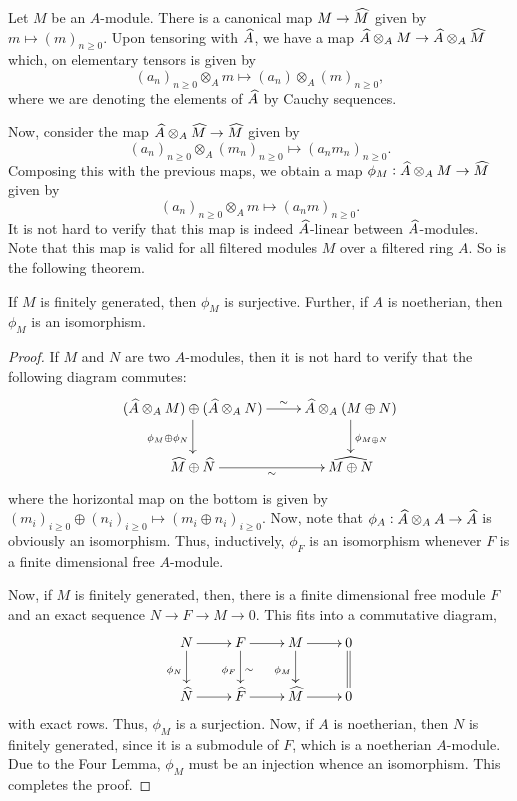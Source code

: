 Let $M$ be an $A$-module. There is a canonical map $M\to\widehat{M}$ given by $m\mapsto(m)_{n\ge 0}$. Upon tensoring with $\widehat{A}$, we have a map $\widehat{A}\otimes_A M\to\widehat{A}\otimes_A\widehat{M}$ which, on elementary tensors is given by 
\begin{equation*}
    (a_n)_{n\ge 0}\otimes_A m\mapsto(a_n)\otimes_A(m)_{n\ge 0},
\end{equation*}
where we are denoting the elements of $\widehat{A}$ by Cauchy sequences. 

Now, consider the map $\widehat{A}\otimes_A\widehat{M}\to\widehat{M}$ given by 
\begin{equation*}
    (a_n)_{n\ge 0}\otimes_A(m_n)_{n\ge 0}\mapsto (a_nm_n)_{n\ge 0}.
\end{equation*}
Composing this with the previous maps, we obtain a map $\phi_M:\widehat{A}\otimes_A M\to\widehat{M}$ given by 
\begin{equation*}
    (a_n)_{n\ge 0}\otimes_A m\mapsto (a_nm)_{n\ge 0}.
\end{equation*}
It is not hard to verify that this map is indeed $\widehat{A}$-linear between $\widehat{A}$-modules. Note that this map is valid for all filtered modules $M$ over a filtered ring $A$. So is the following theorem.

\begin{theorem}
    If $M$ is finitely generated, then $\phi_M$ is surjective. Further, if $A$ is noetherian, then $\phi_M$ is an isomorphism.
\end{theorem}
\begin{proof}
    If $M$ and $N$ are two $A$-modules, then it is not hard to verify that the following diagram commutes: 
    \begin{equation*}
        \xymatrix {
            (\wh A\otimes_A M)\oplus(\wh A\otimes_A N)\ar[r]^-{\sim}\ar[d]_{\phi_M\oplus\phi_N} & \wh A\otimes_A (M\oplus N)\ar[d]^{\phi_{M\oplus N}}\\
            \wh M\oplus\wh N\ar[r]_-\sim & \wh{M\oplus N}
        }
    \end{equation*}
    where the horizontal map on the bottom is given by $(m_i)_{i\ge 0}\oplus(n_i)_{i\ge 0}\mapsto(m_i\oplus n_i)_{i\ge 0}$. Now, note that $\phi_A: \widehat{A}\otimes_A A\to\widehat{A}$ is obviously an isomorphism. Thus, inductively, $\phi_F$ is an isomorphism whenever $F$ is a finite dimensional free $A$-module.

    Now, if $M$ is finitely generated, then, there is a finite dimensional free module $F$ and an exact sequence $N\to F\to M\to 0$. This fits into a commutative diagram, 
    \begin{equation*}
        \xymatrix {
            N\ar[d]_{\phi_N}\ar[r] & F\ar[d]_{\phi_F}^{\sim}\ar[r] & M\ar[d]_{\phi_M}\ar[r] & 0\ar@{=}[d]\\
            \wh N\ar[r] & \wh F\ar[r] & \wh M\ar[r] & 0
        }
    \end{equation*}
    with exact rows. Thus, $\phi_M$ is a surjection. Now, if $A$ is noetherian, then $N$ is finitely generated, since it is a submodule of $F$, which is a noetherian $A$-module. Due to the Four Lemma, $\phi_M$ must be an injection whence an isomorphism. This completes the proof.
\end{proof}

